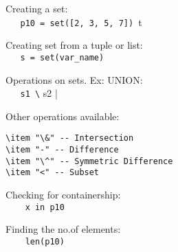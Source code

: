 Creating a set:\\
{\ex \lstinline|   p10 = set([2, 3, 5, 7]) |t}

Creating set from a tuple or list:\\
{\ex \lstinline|   s = set(var_name)|}

Operations on sets. Ex: UNION:\\
{\ex \lstinline|   s1 \| s2 |}

Other operations available:\\

\begin{lstlisting}
\item "\&" -- Intersection
\item "-" -- Difference
\item "\^" -- Symmetric Difference
\item "<" -- Subset
\end{lstlisting}

Checking for containership:\\
{\ex \lstinline|    x in p10|}

Finding the no.of elements:\\
{\ex \lstinline|    len(p10)|}
